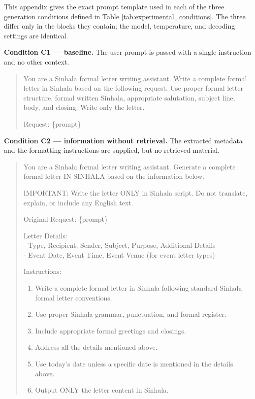\documentclass[12pt]{uomthesis}
\begin{document}
\begin{references}
\end{references}


\begin{appendices}



This appendix gives the exact prompt template used in each of the three generation conditions defined in Table \ref{tab:experimental_conditions}. The three differ only in the blocks they contain; the model, temperature, and decoding settings are identical.

\textbf{Condition C1 — baseline.} The user prompt is passed with a single instruction and no other context.

\begin{quote}
\small
You are a Sinhala formal letter writing assistant. Write a complete formal letter in Sinhala based on the following request. Use proper formal letter structure, formal written Sinhala, appropriate salutation, subject line, body, and closing. Write only the letter.

Request: \{prompt\}
\end{quote}

\textbf{Condition C2 — information without retrieval.} The extracted metadata and the formatting instructions are supplied, but no retrieved material.

\begin{quote}
\small
You are a Sinhala formal letter writing assistant. Generate a complete formal letter IN SINHALA based on the information below.

IMPORTANT: Write the letter ONLY in Sinhala script. Do not translate, explain, or include any English text.

Original Request: \{prompt\}

Letter Details:\\
- Type, Recipient, Sender, Subject, Purpose, Additional Details\\
- Event Date, Event Time, Event Venue (for event letter types)

Instructions:
\begin{enumerate}[nosep]
\item Write a complete formal letter in Sinhala following standard Sinhala formal letter conventions.
\item Use proper Sinhala grammar, punctuation, and formal register.
\item Include appropriate formal greetings and closings.
\item Address all the details mentioned above.
\item Use today's date unless a specific date is mentioned in the details above.
\item Output ONLY the letter content in Sinhala.
\end{enumerate}
\end{quote}


\end{appendices}
\end{document}
